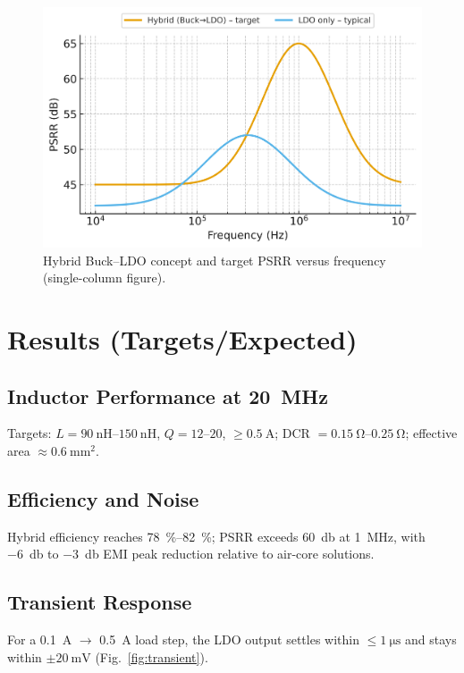 \documentclass[journal]{IEEEtran}
\begin{document}
\begin{figure}[t]
  \centering
  \includegraphics[width=.85\linewidth]{fig/fig4_psrr_target.png}%
  \caption{Hybrid Buck--LDO concept and target PSRR versus frequency (single-column figure).}
  \label{fig:block}
\end{figure}

\section{Results (Targets/Expected)}
\subsection{Inductor Performance at \SI{20}{\mega\hertz}}
Targets: $L=\SIrange{90}{150}{\nano\henry}$, $Q=\numrange{12}{20}$, $\ge\SI{0.5}{\ampere}$; DCR $=\SIrange{0.15}{0.25}{\ohm}$; effective area $\approx\SI{0.6}{\milli\meter\squared}$.

\subsection{Efficiency and Noise}
Hybrid efficiency reaches \SIrange{78}{82}{\percent}; PSRR exceeds \SI{60}{\decibel} at \SI{1}{\mega\hertz}, with \SI{-6}{\decibel} to \SI{-3}{\decibel} EMI peak reduction relative to air-core solutions.

\subsection{Transient Response}
For a \SI{0.1}{\ampere} $\rightarrow$ \SI{0.5}{\ampere} load step, the LDO output settles within $\le\SI{1}{\micro\second}$ and stays within $\pm\SI{20}{\milli\volt}$ (Fig.~\ref{fig:transient}).
\end{document}
